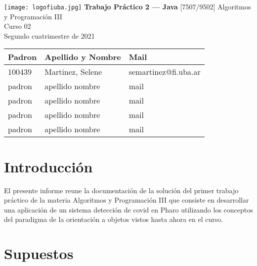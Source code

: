 \documentclass[titlepage,a4paper]{article}
\begin{document}
\begin{titlepage} %
	\hfill\texttt{[image: logofiuba.jpg]}
    \centering
    \vfill
    \Huge \textbf{Trabajo Práctico 2 — Java}
    \vskip2cm
    \Large [7507/9502] Algoritmos y Programación III\\
    Curso 02 \\ %
    Segundo cuatrimestre de 2021 
    \vfill
    \begin{tabular}{ | l | l | l | } %
      \hline
      Padron & Apellido y Nombre & Mail \\ \hline
      100439 & Martinez, Selene & semartinez@fi.uba.ar \\ \hline
      padron & apellido  nombre & mail \\ \hline
      padron & apellido  nombre & mail \\ \hline
      padron & apellido  nombre & mail \\ \hline
      padron & apellido  nombre & mail \\ \hline
  	\end{tabular}
    \vfill
    \vfill
\end{titlepage}

\tableofcontents %
\newpage

\section{Introducción}\label{sec:intro}
El presente informe reune la documentación de la solución del primer trabajo práctico de la materia Algoritmos y Programación III que consiste en desarrollar una aplicación de un sistema detección de covid en Pharo utilizando los conceptos del paradigma de la orientación a objetos vistos hasta ahora en el curso.

\section{Supuestos}\label{sec:supuestos}
\end{document}
